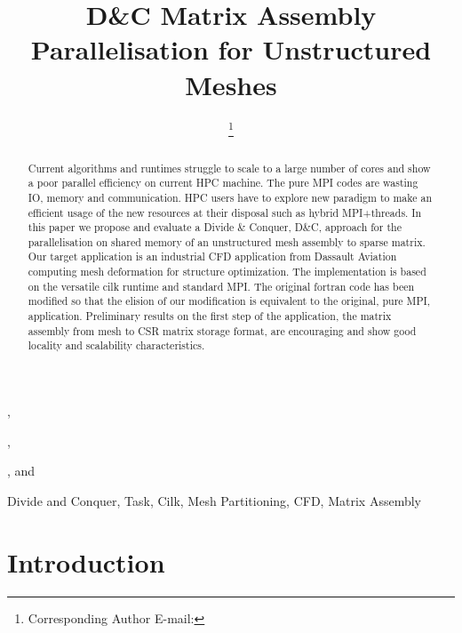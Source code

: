 \documentclass{IOS-Book-Article}
\begin{document}
\begin{frontmatter}              %

\title{D\&C Matrix Assembly Parallelisation for Unstructured Meshes}

\author[A]{ %
\thanks{Corresponding Author E-mail: }},
\author[A]{ },
\author[B]{ },
and
\author[C]{ }

\address[A]{PRISM - University of Versailles, France}
\address[B]{Somwhere}
\address[C]{Dassault Aviation, Saint-Cloud, France}

\begin{abstract}
Current algorithms and runtimes struggle to scale to a large number of cores and show a poor parallel efficiency on current HPC machine.
The pure MPI codes are wasting IO, memory and communication. HPC users have to explore new paradigm to make an efficient usage of the new resources at their disposal such as hybrid MPI+threads. In this paper we propose and evaluate a Divide \& Conquer, D\&C, approach for the parallelisation on shared memory of an unstructured mesh assembly to sparse matrix.
Our target application is an industrial CFD application from Dassault Aviation computing mesh deformation for structure optimization.
The implementation is based on the versatile cilk runtime and standard MPI. The original fortran code has been modified so that the elision of our modification is equivalent to the original, pure MPI, application.
Preliminary results on the first step of the application, the matrix assembly from mesh to CSR matrix storage format, are encouraging and show good locality and scalability characteristics.
\end{abstract}

\begin{keyword}
Divide and Conquer, Task, Cilk, Mesh Partitioning, CFD, Matrix Assembly 
\end{keyword}
\end{frontmatter}

\thispagestyle{empty}
\pagestyle{empty}

\section{Introduction}
\end{document}
